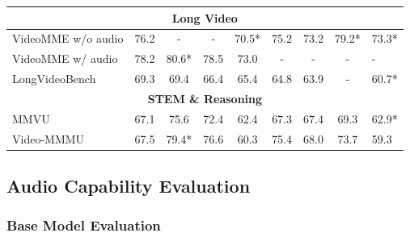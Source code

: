\documentclass{article}
\begin{document}
\begin{table}[htbp]
{\begin{tabular}{l|cccccc|cl}
            \multicolumn{9}{c}{\textbf{Long Video}} \\
            \midrule
            VideoMME w/o audio & 76.2 & -     & -     & 70.5* & 75.2 & 73.2  & 79.2* & 73.3* \\
            VideoMME w/ audio & 78.2     & 80.6* & 78.5 & 73.0 & - & -  & - & - \\
            LongVideoBench    & 69.3 & 69.4  & 66.4 & 65.4 & 64.8 & 63.9  & - & 60.7* \\
            \midrule
            \multicolumn{9}{c}{\textbf{STEM \& Reasoning}} \\
            \midrule
            MMVU              & 67.1 & 75.6  & 72.4 & 62.4 & 67.3 & 67.4  & 69.3 & 62.9* \\
            Video-MMMU        & 67.5 & 79.4* & 76.6 & 60.3 & 75.4 & 68.0  & 73.7 & 59.3 \\
            \bottomrule
        \end{tabular}
    }
    \label{tab:eval_video_und}
\end{table}


\subsection{Audio Capability Evaluation}
\label{sec:audio-eval}

\subsubsection{Base Model Evaluation}
\end{document}
